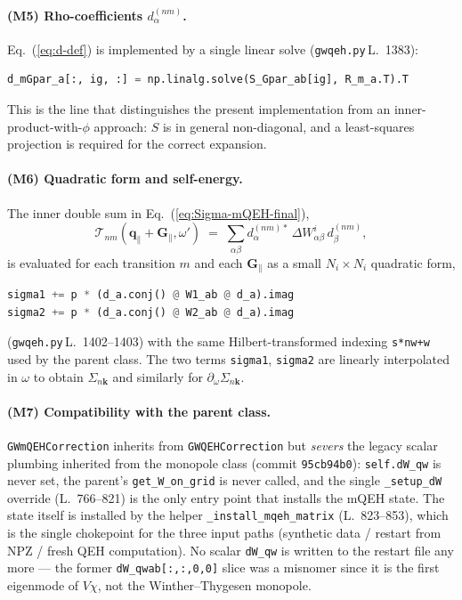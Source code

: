 \documentclass[11pt,a4paper]{article}
\newcommand{\kk}{\mathbf{k}}
\newcommand{\Gpar}{\mathbf{G}_{\!\parallel}}
\newcommand{\qpar}{\mathbf{q}_{\parallel}}
\newcommand{\eq}[1]{Eq.~(\ref{eq:#1})}
\begin{document}
\paragraph{(M5) Rho-coefficients $d^{(nm)}_{\alpha}$.}
\eq{d-def} is implemented by a single linear solve
(\texttt{gwqeh.py}\,L.~1383):
\begin{lstlisting}[language=Python]
d_mGpar_a[:, ig, :] = np.linalg.solve(S_Gpar_ab[ig], R_m_a.T).T
\end{lstlisting}
This is the line that distinguishes the present implementation from
an inner-product-with-$\phi$ approach: $S$ is in general
non-diagonal, and a least-squares projection is required for the
correct expansion.

\paragraph{(M6) Quadratic form and self-energy.}
The inner double sum in \eq{Sigma-mQEH-final},
\begin{equation}
\mathcal{T}_{nm}(\qpar+\Gpar,\omega') \;=\;
\sum_{\alpha\beta}
d^{(nm)*}_{\alpha}\,
\Delta W^{i}_{\alpha\beta}\,
d^{(nm)}_{\beta},
\label{eq:Tnm}
\end{equation}
is evaluated for each transition $m$ and each $\Gpar$ as a small
$N_i\!\times\!N_i$ quadratic form,
\begin{lstlisting}[language=Python]
sigma1 += p * (d_a.conj() @ W1_ab @ d_a).imag
sigma2 += p * (d_a.conj() @ W2_ab @ d_a).imag
\end{lstlisting}
(\texttt{gwqeh.py}\,L.~1402--1403) with the same Hilbert-transformed
indexing \texttt{s*nw+w} used by the parent class.  The two terms
\texttt{sigma1}, \texttt{sigma2} are linearly interpolated in
$\omega$ to obtain $\Sigma_{n\kk}$ and similarly for
$\partial_\omega\Sigma_{n\kk}$.

\paragraph{(M7) Compatibility with the parent class.}
\texttt{GWmQEHCorrection} inherits from \texttt{GWQEHCorrection} but
\emph{severs} the legacy scalar plumbing inherited from the monopole
class (commit \texttt{95cb94b0}): \texttt{self.dW\_qw} is never set,
the parent's \texttt{get\_W\_on\_grid} is never called, and the
single \texttt{\_setup\_dW} override (L.~766--821) is the only entry
point that installs the mQEH state.  The state itself is installed by
the helper \texttt{\_install\_mqeh\_matrix} (L.~823--853), which is
the single chokepoint for the three input paths (synthetic data /
restart from NPZ / fresh QEH computation).  No scalar
\texttt{dW\_qw} is written to the restart file any more --- the
former \texttt{dW\_qwab[:,:,0,0]} slice was a misnomer since it is
the first eigenmode of $V\chi$, not the Winther--Thygesen monopole.
\end{document}
